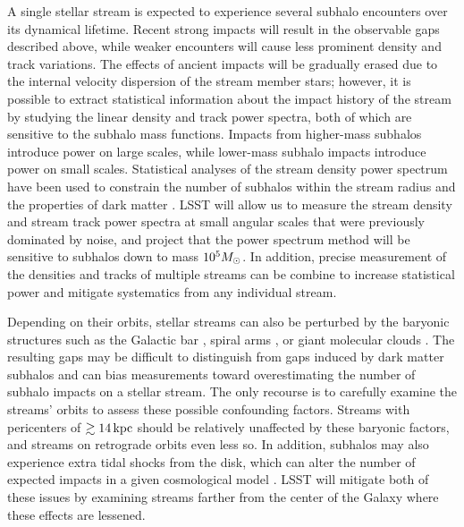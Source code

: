 A single stellar stream is expected to experience several subhalo encounters over its dynamical lifetime. 
Recent strong impacts will result in the observable gaps described above, while weaker encounters will cause less prominent density and track variations.
The effects of ancient impacts will be gradually erased due to the internal velocity dispersion of the stream member stars; however, it is possible to extract statistical information about the impact history of the stream by studying the linear density and track power spectra, both of which are sensitive to the subhalo mass functions.
Impacts from higher-mass subhalos introduce power on large scales, while lower-mass subhalo impacts introduce power on small scales. 
Statistical analyses of the stream density power spectrum have been used to constrain the number of subhalos within the stream radius and the properties of dark matter \citep{bovy:2017, 2018JCAP...07..061B}. 
LSST will allow us to measure the stream density and stream track power spectra at small angular scales that were previously dominated by noise, and \citet{bovy:2017} project that the power spectrum method will be sensitive to subhalos down to mass $10^5 M_\odot$. 
In addition, precise measurement of the densities and tracks of multiple streams can be combine to increase statistical power and mitigate systematics from any individual stream.


Depending on their orbits, stellar streams can also be perturbed by the baryonic structures such as the Galactic bar \citep[\eg,][]{erkal2017,pearson2017}, spiral arms \citep{Banik2018}, or giant molecular clouds \citep{amorisco2016}. The resulting gaps may be difficult to distinguish from gaps induced by dark matter subhalos and can bias measurements toward overestimating the number of subhalo impacts on a stellar stream. The only recourse is to carefully examine the streams' orbits to assess these possible confounding factors. Streams with pericenters of $\gtrsim 14\mathrm{\,kpc}$ should be relatively unaffected by these baryonic factors, and streams on retrograde orbits even less so. In addition, subhalos may also experience extra tidal shocks from the disk, which can alter the number of expected impacts in a given cosmological model \citep[\eg,][]{DOnghia:2009xhq,Garrison-Kimmel2017}. LSST will mitigate both of these issues by examining streams farther from the center of the Galaxy where these effects are lessened.

